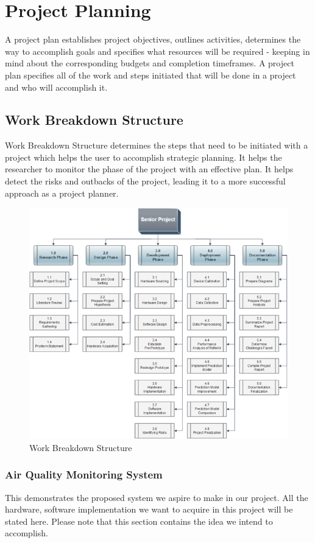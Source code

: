 \chapter{Project Planning}
A project plan establishes project objectives, outlines activities, determines the way to accomplish goals and specifies what resources will be required - keeping in mind about the corresponding budgets and completion timeframes. A project plan specifies all of the work and steps initiated that will be done in a project and who will accomplish it.

\section{Work Breakdown Structure}
Work Breakdown Structure determines the steps that need to be initiated with a project which helps the user to accomplish strategic planning. It helps the researcher to monitor the phase of the project with an effective plan. It helps detect the risks and outbacks of the project, leading it to a more successful approach as a project planner.

\begin{figure} [H]
    \centering
    \includegraphics[width=.8\textwidth]{images/3_1_Work Breakdown Structure.png}
    \caption{Work Breakdown Structure}
    \label{fig:Work Breakdown Structure}
\end{figure}

\subsection{Air Quality Monitoring System}
\vspace{0.5cm}
This demonstrates the proposed system we aspire to make in our project. All the hardware, software implementation we want to acquire in this project will be stated here. Please note that this section contains the idea we intend to accomplish.

